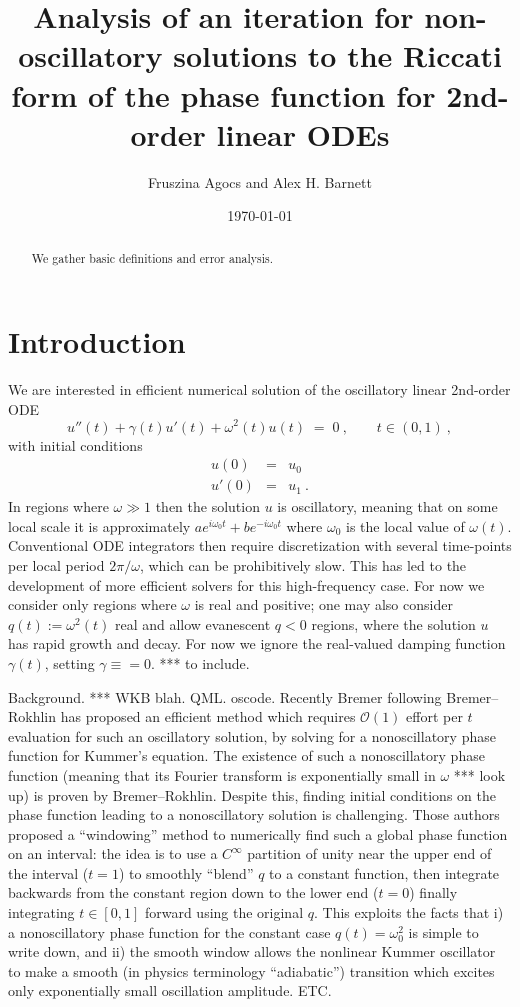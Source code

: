 \documentclass[10pt]{article}
\newcommand{\be}{\begin{equation}}
\newcommand{\ee}{\end{equation}}
\newcommand{\bea}{\begin{eqnarray}}
\newcommand{\eea}{\end{eqnarray}}
\newcommand{\bigO}{{\mathcal O}}
\newcommand{\om}{\omega}
\begin{document}
\title{Analysis of an iteration for non-oscillatory solutions to the Riccati form of the phase function for 2nd-order linear ODEs}

\author{Fruszina Agocs and Alex H. Barnett}
\date{\today}
\maketitle

\begin{abstract}
We gather basic definitions and error analysis.
\end{abstract}

\section{Introduction}

We are interested in efficient numerical solution of
the oscillatory linear 2nd-order ODE
\be
u''(t) +\gamma(t) u'(t) + \om^2(t)u(t) \;=\; 0
~,
\qquad t \in (0,1)~,
\label{ode}
\ee
with initial conditions
\bea
u(0) &=& u_0 \\
\label{ic0}
u'(0) &=& u_1~.
\label{ic1}
\eea
In regions where $\om \gg 1$
then the solution $u$ is oscillatory, meaning that on some local
scale it is approximately $a e^{i\om_0t} + b e^{-i\om_0t}$ where $\om_0$ is the local value of $\om(t)$.
Conventional ODE integrators then require discretization with several
time-points per local period $2\pi/\om$, which can be prohibitively slow.
This has led to the development of more efficient solvers for this
high-frequency case.
For now we consider only regions where $\om$ is real and positive;
one may also consider $q(t):=\om^2(t)$ real and allow evanescent
$q<0$ regions, where the solution $u$ has rapid growth and decay.
For now we ignore the real-valued damping function $\gamma(t)$,
setting $\gamma \equiv =0$. *** to include.

Background. ***
WKB blah.
QML.
oscode.
Recently Bremer following Bremer--Rokhlin has proposed an efficient
method
which requires $\bigO(1)$ effort per $t$ evaluation for such an
oscillatory solution, by solving for a nonoscillatory
phase function for Kummer's equation.
The existence of such a nonoscillatory phase function
(meaning that its Fourier transform is exponentially small in $\om$ ***
look up) is proven by Bremer--Rokhlin.
Despite this, finding initial conditions on the phase function leading to
a nonoscillatory solution is challenging.
Those authors proposed a
``windowing'' method to numerically find such a global phase function
on an interval:
the idea is to use a $C^\infty$ partition of unity near the upper end of the interval ($t=1$) to smoothly ``blend'' $q$ to
a constant function, then integrate backwards from the constant region
down to the lower end ($t=0$)
finally integrating $t\in[0,1]$ forward using the original $q$.
This exploits the facts that i) a nonoscillatory phase function for
the constant case $q(t) = \om_0^2$ is simple to write down, and
ii) the smooth window allows
the nonlinear Kummer oscillator to make a smooth (in physics
terminology ``adiabatic'') transition which excites
only exponentially small oscillation amplitude.
ETC.
\end{document}
